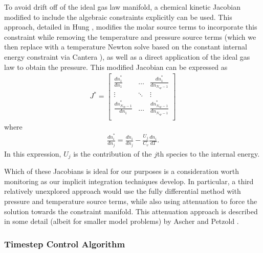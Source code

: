 To avoid drift off of the ideal gas law manifold, a chemical
kinetic Jacobian modified to include the algebraic constraints explicitly can
be used. This approach, detailed in Hung \cite{hung2003algorithms}, modifies the molar source terms to incorporate
this constraint while removing the temperature and pressure source terms (which
we then replace with a temperature Newton solve based on the constant internal
energy constraint via Cantera \cite{cantera}), as well as a direct application of the ideal
gas law to obtain the pressure. This modified Jacobian can be expressed as
\begin{align}
J^{*} = \begin{bmatrix}	\frac{d\dot{n}_{1}^{*}}{dn_{1}} & \hdots & \frac{d\dot{n}_{1}^{*}}{dn_{N_{sp}-1}} \\
	                \vdots & \ddots & \vdots \\
	                \frac{d\dot{n}_{N_{sp}-1}^{*}}{dn_{1}} & \hdots & \frac{d\dot{n}_{N_{sp}-1}^{*}}{dn_{N_{sp}-1}} \\
    \end{bmatrix}
\end{align}
where
\begin{align}
\frac{d\dot{n}_{i}^{*}}{dn_{j}} = \frac{d\dot{n}_{i}}{dn_{j}} - \frac{U_{j}}{C_{v}}\frac{d\dot{n}_{i}}{dT}.
\end{align}
In this expression, $U_{j}$ is the contribution of the $j$th species to the
internal energy.

Which of these Jacobians is ideal for our purposes is a consideration worth
monitoring as our implicit integration techniques develop. In particular, 
a third relatively unexplored approach would use the fully differential
method with pressure and temperature source terms, while also using attenuation
to force the solution towards the constraint manifold. This attenuation approach
is described in some detail (albeit for smaller model problems) by Ascher and
Petzold \cite{ascher1998computer}.

\subsubsection{Timestep Control Algorithm}


